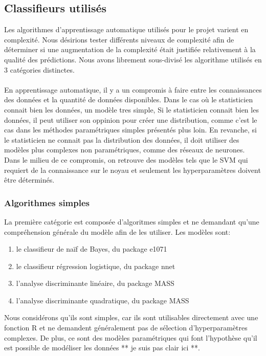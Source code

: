 \subsection{Classifieurs utilisés}
Les algorithmes d'apprentissage automatique utilisés pour le projet varient en complexité. Nous désirions tester différents niveaux de complexité afin de déterminer si une augmentation de la complexité était justifiée relativement à la qualité des prédictions. Nous avons librement sous-divisé les algorithme utilisés en 3 catégories distinctes. \\ \\
En apprentissage automatique, il y a un compromis à faire entre les connaissances des données et la quantité de données disponibles. Dans le cas où le statisticien connait bien les données, un modèle tres simple, Si le statisticien connait bien les données, il peut utiliser son oppinion pour créer une distribution, comme c'est le cas dans les méthodes paramétriques simples présentés plus loin. En revanche, si le statisticien ne connait pas la distribution des données, il doit utiliser des modèles plus complexes non paramétriques, comme des réseaux de neurones. Dans le milieu de ce compromis, on retrouve des modèles tels que le SVM qui requiert de la connaissance sur le noyau et seulement les hyperparamètres doivent être déterminés.

\subsubsection{Algorithmes simples}
La première catégorie est composée d'algoritmes simples et ne demandant qu'une compréhension générale du modèle afin de les utiliser. Les modèles sont:

\begin{enumerate}
  \item le classifieur de naïf de Bayes, du package e1071 \cite{packagee1071}
  \item le classifieur régression logistique, du package nnet \cite{packagennet} 
  \item l'analyse discriminante linéaire, du package MASS \cite{packageMASS}
  \item l'analyse discriminante quadratique, du package MASS  \cite{packageMASS}
\end{enumerate}

Nous considérons qu'ils sont simples, car ils sont utilisables directement avec une fonction R et ne demandent généralement pas de sélection d'hyperparamètres complexes. De plus, ce sont des modèles paramétriques qui font l'hypothèse qu'il est possible de modéliser les données ** je suis pas clair ici **. 


